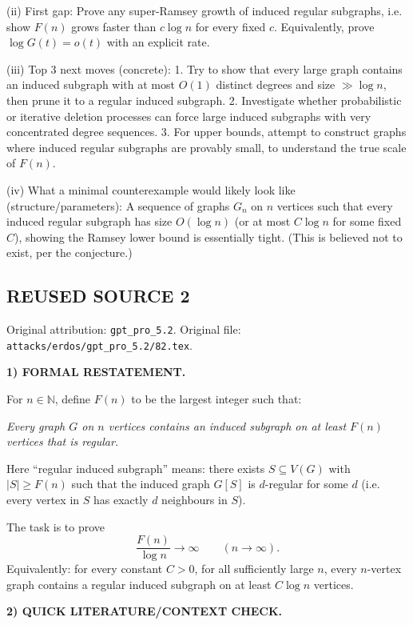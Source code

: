 (ii) First gap:
Prove any super-Ramsey growth of induced regular subgraphs, i.e. show $F(n)$ grows faster than $c\log n$ for every fixed $c$.
Equivalently, prove $\log G(t)=o(t)$ with an explicit rate.

(iii) Top 3 next moves (concrete):
1. Try to show that every large graph contains an induced subgraph with at most $O(1)$ distinct degrees and size $\gg \log n$, then prune it to a regular induced subgraph.
2. Investigate whether probabilistic or iterative deletion processes can force large induced subgraphs with very concentrated degree sequences.
3. For upper bounds, attempt to construct graphs where induced regular subgraphs are provably small, to understand the true scale of $F(n)$.

(iv) What a minimal counterexample would likely look like (structure/parameters):
A sequence of graphs $G_n$ on $n$ vertices such that every induced regular subgraph has size $O(\log n)$ (or at most $C\log n$ for some fixed $C$),
showing the Ramsey lower bound is essentially tight. (This is believed not to exist, per the conjecture.)


\subsection*{REUSED SOURCE 2}
Original attribution: \texttt{gpt\_pro\_5.2}.
Original file: \texttt{attacks/erdos/gpt\_pro\_5.2/82.tex}.


\noindent\textbf{1) FORMAL RESTATEMENT.}

For $n\in\mathbb{N}$, define $F(n)$ to be the largest integer such that:

\emph{Every graph $G$ on $n$ vertices contains an induced subgraph on at least $F(n)$ vertices that is regular.}

Here ``regular induced subgraph'' means: there exists $S\subseteq V(G)$ with $|S|\ge F(n)$ such that the induced graph $G[S]$ is $d$-regular for some $d$ (i.e. every vertex in $S$ has exactly $d$ neighbours in $S$).

The task is to prove
\[
\frac{F(n)}{\log n}\to \infty\qquad (n\to\infty).
\]
Equivalently: for every constant $C>0$, for all sufficiently large $n$, every $n$-vertex graph contains a regular induced subgraph on at least $C\log n$ vertices.

\medskip
\noindent\textbf{2) QUICK LITERATURE/CONTEXT CHECK.}

